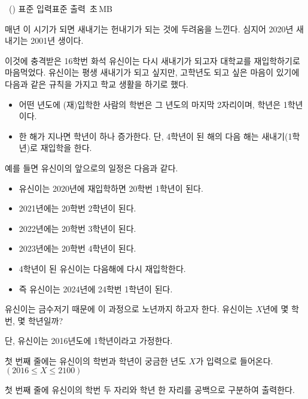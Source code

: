 \begin{problem}{\kcpcprobfirst\ (\kcpcprobfirstshort)}
    {표준 입력}{표준 출력}
    {\kcpcprobfirsttime\,초}{\kcpcprobfirstmemory\,MB}{}
    
    매년 이 시기가 되면 새내기는 헌내기가 되는 것에 두려움을 느낀다. 심지어 2020년 새내기는 2001년 생이다.
    
    이것에 충격받은 16학번 화석 유신이는 다시 새내기가 되고자 대학교를 재입학하기로 마음먹었다.
    유신이는 평생 새내기가 되고 싶지만, 고학년도 되고 싶은 마음이 있기에 다음과 같은 규칙을 가지고 학교 생활을 하기로 했다.
    
    \begin{itemize}
        \item 어떤 년도에 (재)입학한 사람의 학번은 그 년도의 마지막 2자리이며, 학년은 1학년이다.
        \item 한 해가 지나면 학년이 하나 증가한다. 단, 4학년이 된 해의 다음 해는 새내기(1학년)로 재입학을 한다.
    \end{itemize}
    
    예를 들면 유신이의 앞으로의 일정은 다음과 같다.
    
    \begin{itemize}
        \item 유신이는 2020년에 재입학하면 20학번 1학년이 된다.
        \item 2021년에는 20학번 2학년이 된다.
        \item 2022년에는 20학번 3학년이 된다.
        \item 2023년에는 20학번 4학년이 된다.
        \item 4학년이 된 유신이는 다음해에 다시 재입학한다.
        \item 즉 유신이는 2024년에 24학번 1학년이 된다.
    \end{itemize}
    
    유신이는 금수저기 때문에 이 과정으로 노년까지 하고자 한다.
    유신이는 $X$년에 몇 학번, 몇 학년일까?
    
    단, 유신이는 2016년도에 1학년이라고 가정한다.
    
    
    \InputFile
    첫 번째 줄에는 유신이의 학번과 학년이 궁금한 년도 $X$가 입력으로 들어온다. $(2016 \leq X \leq 2100)$
    
    \OutputFile
    첫 번째 줄에 유신이의 학번 두 자리와 학년 한 자리를 공백으로 구분하여 출력한다.
    
    \Examples
    \begin{example}
    \end{example}

\end{problem}

